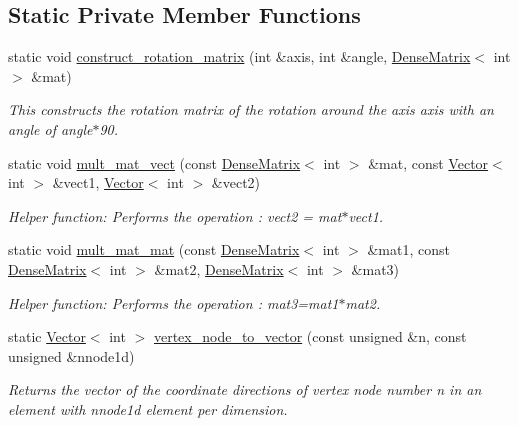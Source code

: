 \subsection*{Static Private Member Functions}
\begin{DoxyCompactItemize}
\item 
static void \hyperlink{classoomph_1_1OcTree_ad3667015671b5dbc06fdc298c59e4064}{construct\+\_\+rotation\+\_\+matrix} (int \&axis, int \&angle, \hyperlink{classoomph_1_1DenseMatrix}{Dense\+Matrix}$<$ int $>$ \&mat)
\begin{DoxyCompactList}\small\item\em This constructs the rotation matrix of the rotation around the axis {\ttfamily axis} with an angle of {\ttfamily angle$\ast$90}. \end{DoxyCompactList}\item 
static void \hyperlink{classoomph_1_1OcTree_a4cb0cccaedfcb4301edcc8dc7cead639}{mult\+\_\+mat\+\_\+vect} (const \hyperlink{classoomph_1_1DenseMatrix}{Dense\+Matrix}$<$ int $>$ \&mat, const \hyperlink{classoomph_1_1Vector}{Vector}$<$ int $>$ \&vect1, \hyperlink{classoomph_1_1Vector}{Vector}$<$ int $>$ \&vect2)
\begin{DoxyCompactList}\small\item\em Helper function\+: Performs the operation \+: vect2 = mat$\ast$vect1. \end{DoxyCompactList}\item 
static void \hyperlink{classoomph_1_1OcTree_ad67128675db4b8d5d3e5815134d78fd2}{mult\+\_\+mat\+\_\+mat} (const \hyperlink{classoomph_1_1DenseMatrix}{Dense\+Matrix}$<$ int $>$ \&mat1, const \hyperlink{classoomph_1_1DenseMatrix}{Dense\+Matrix}$<$ int $>$ \&mat2, \hyperlink{classoomph_1_1DenseMatrix}{Dense\+Matrix}$<$ int $>$ \&mat3)
\begin{DoxyCompactList}\small\item\em Helper function\+: Performs the operation \+: mat3=mat1$\ast$mat2. \end{DoxyCompactList}\item 
static \hyperlink{classoomph_1_1Vector}{Vector}$<$ int $>$ \hyperlink{classoomph_1_1OcTree_a6f2dfb7f1527f77cf2900eecef279ee0}{vertex\+\_\+node\+\_\+to\+\_\+vector} (const unsigned \&n, const unsigned \&nnode1d)
\begin{DoxyCompactList}\small\item\em Returns the vector of the coordinate directions of vertex node number n in an element with nnode1d element per dimension. \end{DoxyCompactList}\end{DoxyCompactItemize}
